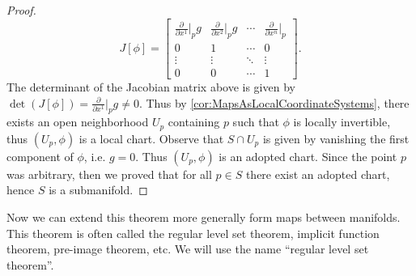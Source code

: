 \begin{proof}
	\[ J[\phi] = \begin{bmatrix}
		\frac{\partial}{\partial  x^1}\big|_{p}g & \frac{\partial}{\partial  x^2}\big|_{p} g & \cdots & \frac{\partial}{\partial  x^n}\big|_{p} \\
		0 & 1 & \cdots & 0 \\
		\vdots & \vdots & \ddots & \vdots \\
		0 & 0 & \cdots & 1
	\end{bmatrix} .\]
	The determinant of the Jacobian matrix above is given by $ \det(J[\phi]) = \frac{\partial}{\partial  x^1}\big|_{p} g  \neq 0$. Thus by \autoref{cor:MapsAsLocalCoordinateSystems}, there exists an open neighborhood $ U_p $ containing $ p $ such that $ \phi $ is locally invertible, thus $ (U_p,\phi) $ is a local chart. Observe that $ S \cap U_p $ is given by vanishing the first component of $ \phi $, i.e. $ g=0 $. Thus $ (U_p,\phi) $ is an adopted chart. Since the point $ p $ was arbitrary, then we proved that for all $ p \in S $ there exist an adopted chart, hence $ S $ is a submanifold.
\end{proof}


Now we can extend this theorem more generally form maps between manifolds. This theorem is often called the regular level set theorem, implicit function theorem, pre-image theorem, etc. We will use the name ``regular level set theorem''.


